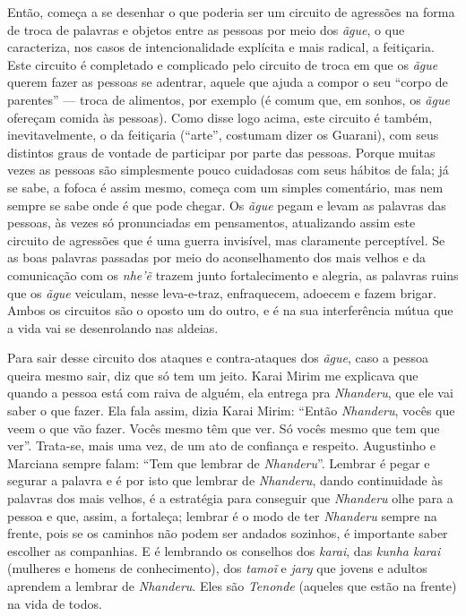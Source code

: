 Então, começa a se desenhar o que poderia ser um circuito de agressões
na forma de troca de palavras e objetos entre as pessoas por meio dos
\emph{ãgue}, o que caracteriza, nos casos de intencionalidade explícita e mais
radical, a feitiçaria. Este circuito é completado e complicado pelo
circuito de troca em que os \emph{ãgue} querem fazer as pessoas se adentrar,
aquele que ajuda a compor o seu ``corpo de parentes'' --- troca de
alimentos, por exemplo (é comum que, em sonhos, os \emph{ãgue} ofereçam comida
às pessoas). Como disse logo acima, este circuito é também,
inevitavelmente, o da feitiçaria (``arte'', costumam dizer os Guarani),
com seus distintos graus de vontade de participar por parte das
pessoas. Porque muitas vezes as pessoas são simplesmente pouco
cuidadosas com seus hábitos de fala; já se sabe, a fofoca é assim
mesmo, começa com um simples comentário, mas nem sempre se sabe onde é
que pode chegar.  Os \emph{ãgue} pegam e levam as palavras das pessoas, às
vezes só pronunciadas em pensamentos, atualizando assim este circuito
de agressões que é uma guerra invisível, mas claramente perceptível. Se
as boas palavras passadas por meio do aconselhamento dos mais velhos e
da comunicação com os \emph{nhe’ẽ} trazem junto fortalecimento e
alegria, as palavras ruins que os \emph{ãgue} veiculam, nesse leva-e-traz,
enfraquecem, adoecem e fazem brigar. Ambos os circuitos são o oposto um
do outro, e é na sua interferência mútua que a vida vai se desenrolando
nas aldeias. 

Para sair desse circuito dos ataques e contra-ataques dos \emph{ãgue}, caso a
pessoa queira mesmo sair, diz que só tem um jeito. Karai Mirim me
explicava que quando a pessoa está com raiva de alguém, ela entrega pra
\emph{Nhanderu}, que ele vai saber o que fazer. Ela fala assim, dizia Karai
Mirim: ``Então \emph{Nhanderu}, vocês que veem o que vão fazer. Vocês mesmo têm
que ver. Só vocês mesmo que tem que ver''. Trata-se, mais uma vez, de um
ato de confiança e respeito. Augustinho e Marciana sempre falam: ``Tem
que lembrar de \emph{Nhanderu}''. Lembrar é pegar e segurar a palavra e é por
isto que lembrar de \emph{Nhanderu}, dando continuidade às palavras dos mais
velhos, é a estratégia para conseguir que \emph{Nhanderu} olhe para a pessoa e
que, assim, a fortaleça; lembrar é o modo de ter \emph{Nhanderu} sempre na
frente, pois se os caminhos não podem ser andados sozinhos, é
importante saber escolher as companhias. E é lembrando os conselhos dos
\emph{karai}, das \emph{kunha karai} (mulheres e homens de conhecimento), dos
\emph{tamoĩ} e \emph{jary} que jovens e adultos aprendem a lembrar de \emph{Nhanderu}.
Eles são \emph{Tenonde} (aqueles que estão na frente) na vida de todos.

